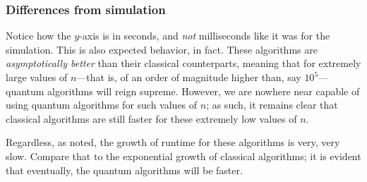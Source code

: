 \documentclass[12pt]{article}
\begin{document}

\subsubsection*{Differences from simulation}

Notice how the $y$-axis is in seconds, and \textit{not} milliseconds like it was for the simulation.
This is also expected behavior, in fact.
These algorithms are \textit{asymptotically better} than their classical counterparts, meaning that for extremely large values of $n$---that is, of an order of magnitude higher than, say $10^5$---quantum algorithms will reign supreme.
However, we are nowhere near capable of using quantum algorithms for such values of $n$; as such, it remains clear that classical algorithms are still faster for these extremely low values of $n$.

Regardless, as noted, the growth of runtime for these algorithms is very, very slow.
Compare that to the exponential growth of classical algorithms; it is evident that eventually, the quantum algorithms will be faster.
\end{document}
